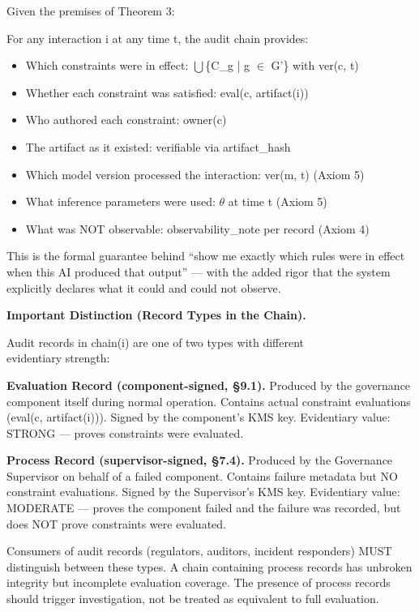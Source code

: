 \begin{ccor}
Given the premises of Theorem 3:

For any interaction i at any time t, the audit chain provides:
\begin{itemize}
  \item Which constraints were in effect: $\bigcup$\{C\_\allowbreak{}g | g $\in$ G'\} with ver(c, t)
  \item Whether each constraint was satisfied: eval(c, artifact(i))
  \item Who authored each constraint: owner(c)
  \item The artifact as it existed: verifiable via artifact\_\allowbreak{}hash
  \item Which model version processed the interaction: ver(m, t)  (Axiom 5)
  \item What inference parameters were used: $\theta$ at time t  (Axiom 5)
  \item What was NOT observable: observability\_\allowbreak{}note per record  (Axiom 4)
\end{itemize}

This is the formal guarantee behind ``show me exactly which rules were in effect when this AI produced that output'' --- with the added rigor that the system explicitly declares what it could and could not observe.

\smallskip\noindent\textbf{Important Distinction (Record Types in the Chain).}
\begin{claddisp}
Audit records in chain(i) are one of two types with different\\
evidentiary strength:\\
\end{claddisp}
\smallskip\noindent\textbf{Evaluation Record (component-signed, \S{}9.1).}
Produced by the governance component itself during normal operation.
Contains actual constraint evaluations (eval(c, artifact(i))).
Signed by the component's KMS key.
Evidentiary value: STRONG --- proves constraints were evaluated.

\smallskip\noindent\textbf{Process Record (supervisor-signed, \S{}7.4).}
Produced by the Governance Supervisor on behalf of a failed component.
Contains failure metadata but NO constraint evaluations.
Signed by the Supervisor's KMS key.
Evidentiary value: MODERATE --- proves the component failed and the failure was recorded, but does NOT prove constraints were evaluated.

Consumers of audit records (regulators, auditors, incident responders) MUST distinguish between these types. A chain containing process records has unbroken integrity but incomplete evaluation coverage.
The presence of process records should trigger investigation, not be treated as equivalent to full evaluation.

\end{ccor}




